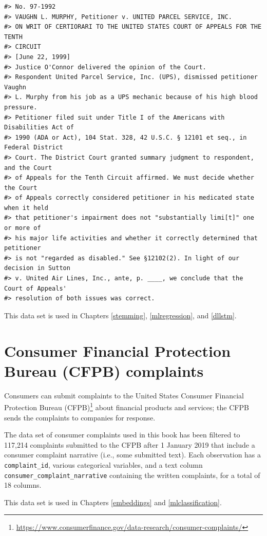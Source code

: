 \documentclass[
]{krantz}
\DeclareRobustCommand{\href}[2]{#2\footnote{\url{#1}}}
\renewcommand{\href}[2]{#2\footnote{\url{#1}}}
\begin{document}
\begin{verbatim}
#> No. 97-1992
#> VAUGHN L. MURPHY, Petitioner v. UNITED PARCEL SERVICE, INC.
#> ON WRIT OF CERTIORARI TO THE UNITED STATES COURT OF APPEALS FOR THE TENTH
#> CIRCUIT
#> [June 22, 1999]
#> Justice O'Connor delivered the opinion of the Court.
#> Respondent United Parcel Service, Inc. (UPS), dismissed petitioner Vaughn
#> L. Murphy from his job as a UPS mechanic because of his high blood pressure.
#> Petitioner filed suit under Title I of the Americans with Disabilities Act of
#> 1990 (ADA or Act), 104 Stat. 328, 42 U.S.C. § 12101 et seq., in Federal District
#> Court. The District Court granted summary judgment to respondent, and the Court
#> of Appeals for the Tenth Circuit affirmed. We must decide whether the Court
#> of Appeals correctly considered petitioner in his medicated state when it held
#> that petitioner's impairment does not "substantially limi[t]" one or more of
#> his major life activities and whether it correctly determined that petitioner
#> is not "regarded as disabled." See §12102(2). In light of our decision in Sutton
#> v. United Air Lines, Inc., ante, p. ____, we conclude that the Court of Appeals'
#> resolution of both issues was correct.
\end{verbatim}

This data set is used in Chapters \ref{stemming}, \ref{mlregression}, and \ref{dllstm}.

\hypertarget{cfpb-complaints}{%
\section{Consumer Financial Protection Bureau (CFPB) complaints}\label{cfpb-complaints}}

Consumers can submit complaints to the \href{https://www.consumerfinance.gov/data-research/consumer-complaints/}{United States Consumer Financial Protection Bureau (CFPB)} about financial products and services; the CFPB sends the complaints to companies for response.

The data set of consumer complaints used in this book has been filtered to 117,214 complaints submitted to the CFPB after 1 January 2019 that include a consumer complaint narrative (i.e., some submitted text). Each observation has a \texttt{complaint\_id}, various categorical variables, and a text column \texttt{consumer\_complaint\_narrative} containing the written complaints, for a total of 18 columns.

This data set is used in Chapters \ref{embeddings} and \ref{mlclassification}.
\end{document}
